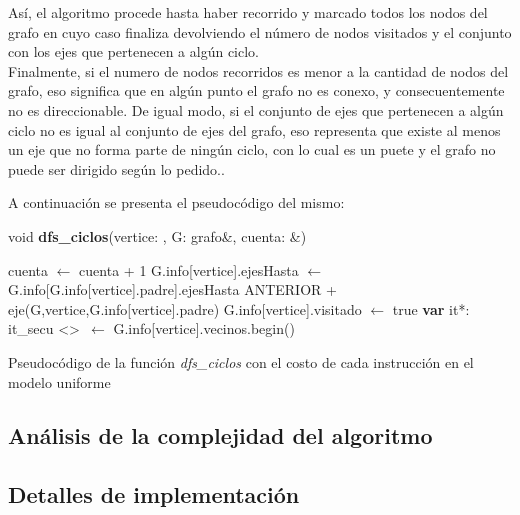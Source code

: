 Así, el algoritmo procede hasta haber recorrido y marcado todos los nodos del grafo en cuyo caso finaliza devolviendo el número de nodos visitados y el conjunto con los ejes que pertenecen a algún ciclo. \\
Finalmente, si el numero de nodos recorridos es menor a la cantidad de nodos del grafo, eso significa que en algún punto el grafo no es conexo, y consecuentemente no es direccionable. De igual modo, si el conjunto de ejes que pertenecen a algún ciclo no es igual al conjunto de ejes del grafo, eso representa que existe al menos un eje que no forma parte de ningún ciclo, con lo cual es un puete y el grafo no puede ser dirigido según lo pedido..

A continuación se presenta el pseudocódigo del mismo: \\

\incmargin{1em}
\linesnumbered
{}

void \textbf{dfs\_ciclos}(vertice: \nat, G: grafo\&, cuenta: \nat\&) \\
\begin{algorithm}[H]
	\BlankLine
	cuenta $\leftarrow$ cuenta + 1 
	G.info[vertice].ejesHasta $\leftarrow$ G.info[G.info[vertice].padre].ejesHasta 
	ANTERIOR + eje(G,vertice,G.info[vertice].padre) 
	G.info[vertice].visitado $\leftarrow$ true 
	\BlankLine
	\textbf{var} it*: it\_secu \textless \nat \textgreater \ $\leftarrow $ G.info[vertice].vecinos.begin() 
	\BlankLine

	\caption{Pseudocódigo de la función \textit{dfs\_ciclos} con el costo de cada instrucción en el modelo uniforme}
\end{algorithm}


\subsection{Análisis de la complejidad del algoritmo}
\label{complejidad2}

\subsection{Detalles de implementación}
\label{imp2}

